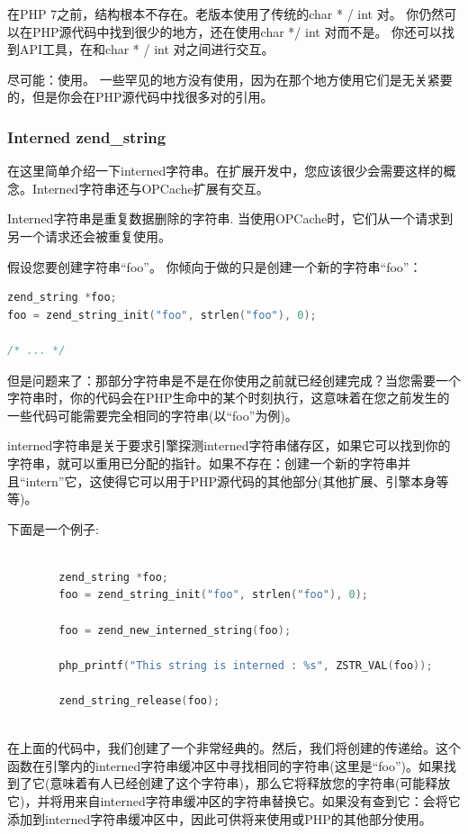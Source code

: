 在PHP 7之前，结构根本不存在。老版本使用了传统的char * / int 对。 你仍然可以在PHP源代码中找到很少的地方，还在使用char */ int 对而不是。 你还可以找到API工具，在和char * / int 对之间进行交互。

尽可能：使用。 一些罕见的地方没有使用，因为在那个地方使用它们是无关紧要的，但是你会在PHP源代码中找很多对的引用。

\subsubsection{Interned zend\_string}

在这里简单介绍一下interned字符串。在扩展开发中，您应该很少会需要这样的概念。Interned字符串还与OPCache扩展有交互。

Interned字符串是重复数据删除的字符串. 当使用OPCache时，它们从一个请求到另一个请求还会被重复使用。

假设您要创建字符串“foo”。 你倾向于做的只是创建一个新的字符串“foo”：

\begin{lstlisting}[language=c]
zend_string *foo;
foo = zend_string_init("foo", strlen("foo"), 0);

/* ... */
\end{lstlisting} 

但是问题来了：那部分字符串是不是在你使用之前就已经创建完成？当您需要一个字符串时，你的代码会在PHP生命中的某个时刻执行，这意味着在您之前发生的一些代码可能需要完全相同的字符串(以“foo”为例)。

interned字符串是关于要求引擎探测interned字符串储存区，如果它可以找到你的字符串，就可以重用已分配的指针。如果不存在：创建一个新的字符串并且“intern”它，这使得它可以用于PHP源代码的其他部分(其他扩展、引擎本身等等)。


下面是一个例子:

\begin{lstlisting}[language=c]

        zend_string *foo;
        foo = zend_string_init("foo", strlen("foo"), 0);

        foo = zend_new_interned_string(foo);

        php_printf("This string is interned : %s", ZSTR_VAL(foo));

        zend_string_release(foo);
        
\end{lstlisting}


在上面的代码中，我们创建了一个非常经典的。然后，我们将创建的传递给。这个函数在引擎内的interned字符串缓冲区中寻找相同的字符串(这里是“foo”)。如果找到了它(意味着有人已经创建了这个字符串)，那么它将释放您的字符串(可能释放它)，并将用来自interned字符串缓冲区的字符串替换它。如果没有查到它：会将它添加到interned字符串缓冲区中，因此可供将来使用或PHP的其他部分使用。

